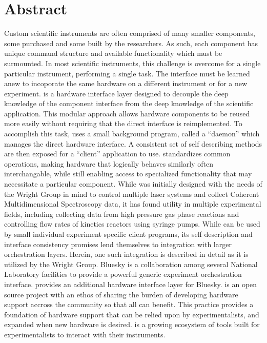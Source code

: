 
\chapter*{Abstract}


Custom scientific instruments are often comprised of many smaller components, some purchased and some built by the researchers.
As such, each component has unique command structure and available functionality which must be surmounted.
In most scientific instruments, this challenge is overcome for a single particular instrument, performing a single task.
The interface must be learned anew to incoporate the same hardware on a different instrument or for a new experiment.
\yaq{} is a hardware interface layer designed to decouple the deep knowledge of the component interface from the deep knowledge of the scientific application.
This modular approach allows hardware components to be reused more easily without requiring that the direct interface is reimplemented.
To accomplish this task, \yaq{} uses a small background program, called a ``daemon'' which manages the direct hardware interface.
A consistent set of self describing methods are then exposed for a ``client'' application to use.
\yaq{} standardizes common operations, making hardware that logically behaves similarly often interchangable, while still enabling access to specialized functionality that may necessitate a particular component.
While \yaq{} was initially designed with the needs of the Wright Group in mind to control multiple laser systems and collect Coherent Multidimensional Spectroscopy data, it has found utility in multiple experimental fields, including collecting data from high pressure gas phase reactions and controlling flow rates of kinetics reactors using syringe pumps.
While \yaq{} can be used by small individual experiment specific client programs, its self description and interface consistency promises lend themselves to integration with larger orchestration layers.
Herein, one such integration is described in detail as it is utilized by the Wright Group.
Bluesky is a collaboration among several National Laboratory facilities to provide a powerful generic experiment orchestration interface.
\yaq{} provides an additional hardware interface layer for Bluesky.
\yaq{} is an open source project with an ethos of sharing the burden of developing hardware support accross the community so that all can benefit.
This practice provides a foundation of \yaq{} hardware support that can be relied upon by experimentalists, and expanded when new hardware is desired.
\yaq{} is a growing ecosystem of tools built for experimentalists to interact with their instruments.
